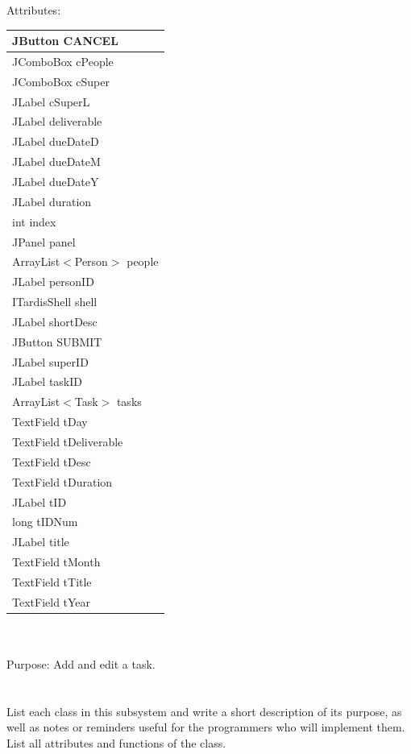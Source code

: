 Attributes:\\
\begin{tabular}{| l |}
\hline
JButton CANCEL\\
\hline
JComboBox cPeople\\
\hline
JComboBox cSuper\\
\hline
JLabel cSuperL\\
\hline
JLabel deliverable\\
\hline
JLabel dueDateD\\
\hline
JLabel dueDateM\\
\hline
JLabel dueDateY\\
\hline
JLabel duration\\
\hline
int index\\
\hline
JPanel panel\\
\hline
ArrayList$<$Person$>$ people\\
\hline
JLabel personID\\
\hline
ITardisShell shell\\
\hline
JLabel shortDesc\\
\hline
JButton SUBMIT\\
\hline
JLabel superID\\
\hline
JLabel taskID\\
\hline
ArrayList$<$Task$>$ tasks\\
\hline
TextField tDay\\
\hline
TextField tDeliverable\\
\hline
TextField tDesc\\
\hline
TextField tDuration\\
\hline
JLabel tID\\
\hline
long tIDNum\\
\hline
JLabel title\\
\hline
TextField tMonth\\
\hline
TextField tTitle\\
\hline
TextField tYear\\
\hline
\end{tabular}\\
\\
Purpose: Add and edit a task.\\
\\
\\
List each class in this subsystem and write a short description of its purpose,
as well as notes or reminders useful for the programmers who will implement them.
List all attributes and functions of the class.